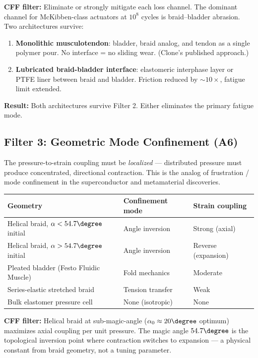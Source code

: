\documentclass[11pt, a4paper]{article}
\begin{document}
\textbf{CFF filter:} Eliminate or strongly mitigate each loss
channel. The dominant channel for McKibben-class actuators at
$10^8$ cycles is braid--bladder abrasion. Two architectures
survive:

\begin{enumerate}[nosep]
  \item \textbf{Monolithic musculotendon}: bladder, braid analog,
        and tendon as a single polymer pour. No interface = no
        sliding wear. (Clone's published approach.)
  \item \textbf{Lubricated braid-bladder interface}: elastomeric
        interphase layer or PTFE liner between braid and bladder.
        Friction reduced by $\sim 10\times$, fatigue limit
        extended.
\end{enumerate}

\textbf{Result:} Both architectures survive Filter 2. Either
eliminates the primary fatigue mode.

\subsection{Filter 3: Geometric Mode Confinement (A6)}

The pressure-to-strain coupling must be \textit{localized} ---
distributed pressure must produce concentrated, directional
contraction. This is the analog of frustration / mode confinement
in the superconductor and metamaterial discoveries.

\begin{center}
\begin{tabular}{@{}lll@{}}
\toprule
\textbf{Geometry} & \textbf{Confinement mode} &
  \textbf{Strain coupling} \\
\midrule
Helical braid, $\alpha < 54.7\degree$ initial & Angle inversion &
  Strong (axial) \\
Helical braid, $\alpha > 54.7\degree$ initial & Angle inversion &
  Reverse (expansion) \\
Pleated bladder (Festo Fluidic Muscle) & Fold mechanics &
  Moderate \\
Series-elastic stretched braid & Tension transfer &
  Weak \\
Bulk elastomer pressure cell & None (isotropic) &
  None \\
\bottomrule
\end{tabular}
\end{center}

\textbf{CFF filter:} Helical braid at sub-magic-angle
($\alpha_0 \approx 20\degree$ optimum) maximizes axial coupling
per unit pressure. The magic angle $54.7\degree$ is the topological
inversion point where contraction switches to expansion --- a
physical constant from braid geometry, not a tuning parameter.
\end{document}
